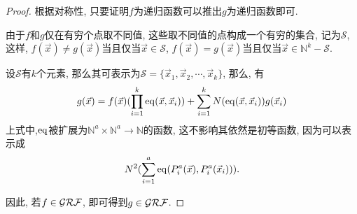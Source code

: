 \begin{proof}
    根据对称性, 只要证明$f$为递归函数可以推出$g$为递归函数即可.

    由于$f$和$g$仅在有穷个点取不同值, 这些取不同值的点构成一个有穷的集合, 记为$\mathcal{S}$, 这样, $f(\vec{x})\neq g(\vec{x})$当且仅当$\vec{x}\in\mathcal{S}$, $f(\vec{x})=g(\vec{x})$当且仅当$\vec{x}\in\mathbb{N}^k-\mathcal{S}$.

    设$\mathcal{S}$有$k$个元素, 那么其可表示为$\mathcal{S}=\{\vec{x}_1,\vec{x}_2,\cdots,\vec{x}_k\}$, 那么, 有
    $$g(\vec{x})=f(\vec{x})(\prod_{i=1}^k \mathrm{eq}(\vec{x},\vec{x}_i))+\sum_{i=1}^k N(\mathrm{eq}(\vec{x},\vec{x}_i))g(\vec{x}_i)$$
    上式中,$\mathrm{eq}$被扩展为$\mathbb{N}^a\times\mathbb{N}^a\to\mathbb{N}$的函数, 这不影响其依然是初等函数, 因为可以表示成
	$$N^2(\sum_{i=1}^a \mathrm{eq}(P^a_i(\vec{x}), P^a_i(\vec{x}_i))).$$

	因此, 若$f\in\mathcal{GRF}$, 即可得到$g\in\mathcal{GRF}$.
\end{proof}
